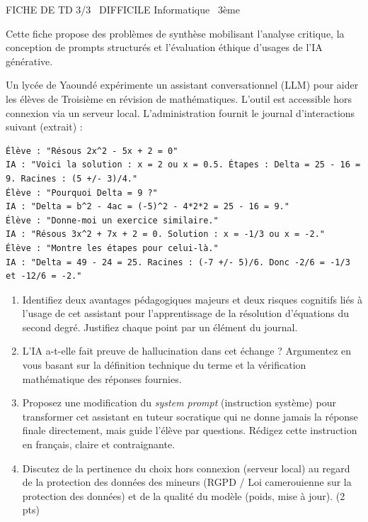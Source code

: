 \documentclass[11pt]{article}
\begin{document}
\begin{tcolorbox}[enhanced,colback=popink,colframe=popink,arc=10pt,boxrule=0pt,left=12pt,right=12pt,top=9pt,bottom=9pt]
{\color{white}\popxbold\small FICHE DE TD 3/3 \textbullet\ DIFFICILE \hfill Informatique \textbullet\ 3ème\par}
\end{tcolorbox}
\vspace{4pt}
Cette fiche propose des problèmes de synthèse mobilisant l'analyse critique, la conception de prompts structurés et l'évaluation éthique d'usages de l'IA générative.

\begin{exercice}
Un lycée de Yaoundé expérimente un assistant conversationnel (LLM) pour aider les élèves de Troisième en révision de mathématiques. L'outil est accessible hors connexion via un serveur local. L'administration fournit le journal d'interactions suivant (extrait) :

\begin{verbatim}
Élève : "Résous 2x^2 - 5x + 2 = 0"
IA : "Voici la solution : x = 2 ou x = 0.5. Étapes : Delta = 25 - 16 = 9. Racines : (5 +/- 3)/4."
Élève : "Pourquoi Delta = 9 ?"
IA : "Delta = b^2 - 4ac = (-5)^2 - 4*2*2 = 25 - 16 = 9."
Élève : "Donne-moi un exercice similaire."
IA : "Résous 3x^2 + 7x + 2 = 0. Solution : x = -1/3 ou x = -2."
Élève : "Montre les étapes pour celui-là."
IA : "Delta = 49 - 24 = 25. Racines : (-7 +/- 5)/6. Donc -2/6 = -1/3 et -12/6 = -2."
\end{verbatim}
\begin{enumerate}
    \item Identifiez deux avantages pédagogiques majeurs et deux risques cognitifs liés à l'usage de cet assistant pour l'apprentissage de la résolution d'équations du second degré. Justifiez chaque point par un élément du journal.
    \item L'IA a-t-elle fait preuve de \og hallucination \fg{} dans cet échange ? Argumentez en vous basant sur la définition technique du terme et la vérification mathématique des réponses fournies.
    \item Proposez une modification du \textit{system prompt} (instruction système) pour transformer cet assistant en \og tuteur socratique \fg{} qui ne donne jamais la réponse finale directement, mais guide l'élève par questions. Rédigez cette instruction en français, claire et contraignante.
    \item Discutez de la pertinence du choix \og hors connexion \fg{} (serveur local) au regard de la protection des données des mineurs (RGPD / Loi camerouienne sur la protection des données) et de la qualité du modèle (poids, mise à jour). (2 pts)
\end{enumerate}
\end{exercice}
\end{document}
